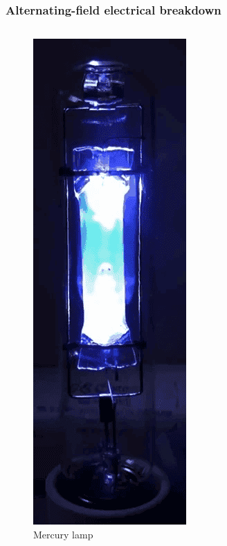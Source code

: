\documentclass{beamer}
\begin{document}
	\begin{frame}
		\frametitle{Alternating-field electrical breakdown}
		
		\begin{columns}
			\begin{figure}
				\centering
				\includegraphics[width=1\linewidth]{res/hg_lamp.png}
				\caption*{Mercury lamp}
			\end{figure}
			

\end{columns}
\end{frame}
\end{document}
